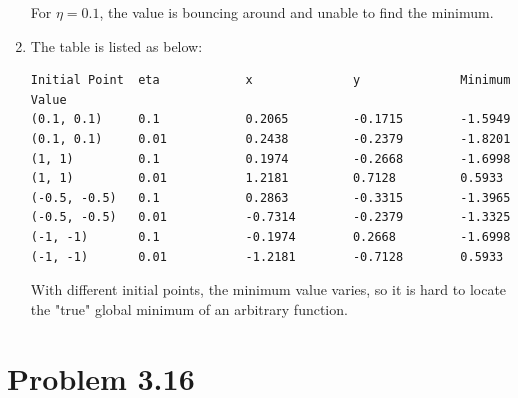 \documentclass{article}
\def\math#1{$#1$}
\begin{document}
\begin{enumerate}
    For \math{\eta = 0.1}, the value is bouncing around and unable to find the minimum.
    \item The table is listed as below:
        \begin{verbatim}
Initial Point  eta            x              y              Minimum Value  
(0.1, 0.1)     0.1            0.2065         -0.1715        -1.5949        
(0.1, 0.1)     0.01           0.2438         -0.2379        -1.8201        
(1, 1)         0.1            0.1974         -0.2668        -1.6998        
(1, 1)         0.01           1.2181         0.7128         0.5933         
(-0.5, -0.5)   0.1            0.2863         -0.3315        -1.3965        
(-0.5, -0.5)   0.01           -0.7314        -0.2379        -1.3325        
(-1, -1)       0.1            -0.1974        0.2668         -1.6998        
(-1, -1)       0.01           -1.2181        -0.7128        0.5933              
\end{verbatim}
        With different initial points, the minimum value varies, so it is hard to locate the "true" global minimum of an arbitrary function.
\end{enumerate}

\section{Problem 3.16}
\end{document}
